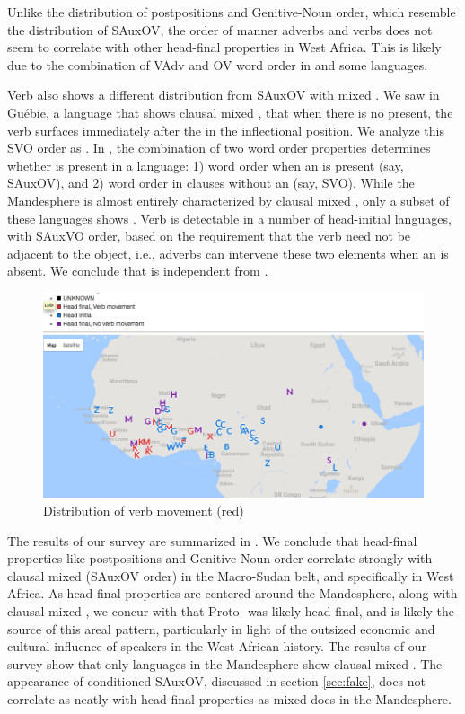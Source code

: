 \documentclass[output=paper]{LSP/langsci}
\begin{document}
Unlike the distribution of postpositions and Genitive-Noun order, which resemble the distribution of SAuxOV, the order of manner adverbs and verbs does not seem to correlate with other head-final properties in West Africa. This is likely due to the combination of VAdv and OV word order in  and some  languages.

Verb  also shows a different distribution from SAuxOV with mixed . We saw in Gu\'ebie, a language that shows clausal mixed , that when there is no  present, the verb surfaces immediately after the  in the inflectional position. We analyze this SVO order as . In , the combination of two word order properties determines whether  is present in a language: 1) word order when an  is present (say, SAuxOV), and 2) word order in clauses without an  (say, SVO). While the Mandesphere is almost entirely characterized by clausal mixed , only a subset of these languages shows . Verb  is detectable in a number of head-initial languages, with SAuxVO order, based on the requirement that the verb need not be adjacent to the object, i.e., adverbs can intervene these two elements when an  is absent. We conclude that  is independent from .

\begin{figure}
   \centering
    \includegraphics[width = .7\textwidth]{figures/VMove}
    \caption{Distribution of verb movement (red)}\label{fig:sande:vmove}
\end{figure}

The results of our survey are summarized in . We conclude that head-final properties like postpositions and Genitive-Noun order correlate strongly with clausal mixed  (SAuxOV  order) in the Macro-Sudan belt, and specifically in West Africa. As head final properties are centered around the Mandesphere, along with clausal mixed , we concur with \citet{heine76} that Proto- was likely head final, and is likely the source of this areal pattern, particularly in light of the outsized economic and cultural influence of  speakers in the West African history. The results of our survey show that only languages in the Mandesphere show clausal mixed-. The appearance of conditioned SAuxOV, discussed in section \ref{sec:fake}, does not correlate as neatly with head-final properties as mixed  does in the Mandesphere.
\end{document}
